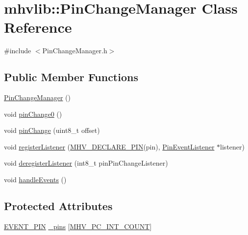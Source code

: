 \hypertarget{classmhvlib_1_1_pin_change_manager}{\section{mhvlib\-:\-:Pin\-Change\-Manager Class Reference}
\label{classmhvlib_1_1_pin_change_manager}
}


{\ttfamily \#include $<$Pin\-Change\-Manager.\-h$>$}

\subsection*{Public Member Functions}
\begin{DoxyCompactItemize}
\item 
\hyperlink{classmhvlib_1_1_pin_change_manager_a6fce9ae803f407df2dbedbd5856ce900}{Pin\-Change\-Manager} ()
\item 
void \hyperlink{classmhvlib_1_1_pin_change_manager_a3c58ac214ba242d3f2f81089f4a457de}{pin\-Change0} ()
\item 
void \hyperlink{classmhvlib_1_1_pin_change_manager_a7d3e61d8deec59cc51ee47b330be6bc9}{pin\-Change} (uint8\-\_\-t offset)
\item 
void \hyperlink{classmhvlib_1_1_pin_change_manager_ae8d988dc4fa2c038046fff692b6afed8}{register\-Listener} (\hyperlink{io_8h_afb172d17be3890bb07e5ceec5a014b91}{M\-H\-V\-\_\-\-D\-E\-C\-L\-A\-R\-E\-\_\-\-P\-I\-N}(pin), \hyperlink{classmhvlib_1_1_pin_event_listener}{Pin\-Event\-Listener} $\ast$listener)
\item 
void \hyperlink{classmhvlib_1_1_pin_change_manager_ac98f357255e910af3627f1597e92e748}{deregister\-Listener} (int8\-\_\-t pin\-Pin\-Change\-Listener)
\item 
void \hyperlink{classmhvlib_1_1_pin_change_manager_ae7182bf75842412e1b9398f987b6dbf9}{handle\-Events} ()
\end{DoxyCompactItemize}
\subsection*{Protected Attributes}
\begin{DoxyCompactItemize}
\item 
\hyperlink{namespacemhvlib_acf4cd7c00d020d1fef8ecfe350328f3b}{E\-V\-E\-N\-T\-\_\-\-P\-I\-N} \hyperlink{classmhvlib_1_1_pin_change_manager_a0f962e7260dd7b06d68ecd234dca3f7e}{\-\_\-pins} \mbox{[}\hyperlink{_m_h_v__io__attiny85_8h_ac3370faa54861753416a738657731f6b}{M\-H\-V\-\_\-\-P\-C\-\_\-\-I\-N\-T\-\_\-\-C\-O\-U\-N\-T}\mbox{]}
\end{DoxyCompactItemize}


